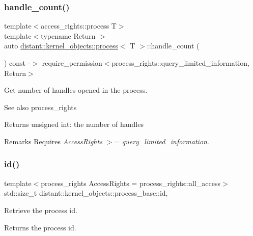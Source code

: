 \subsubsection{\texorpdfstring{handle\+\_\+count()}{handle\_count()}}
{\footnotesize\ttfamily template$<$access\+\_\+rights\+::process T$>$ \\
template$<$typename Return $>$ \\
auto \mbox{\hyperlink{classdistant_1_1kernel__objects_1_1process}{distant\+::kernel\+\_\+objects\+::process}}$<$ T $>$\+::handle\+\_\+count (\begin{DoxyParamCaption}{ }\end{DoxyParamCaption}) const -\/$>$ require\+\_\+permission$<$process\+\_\+rights\+::query\+\_\+limited\+\_\+information, Return$>$}



Get number of handles opened in the process. 

\begin{DoxySeeAlso}{See also}
process\+\_\+rights 
\end{DoxySeeAlso}
\begin{DoxyReturn}{Returns}
unsigned int\+: the number of handles 
\end{DoxyReturn}
\begin{DoxyRemark}{Remarks}
Requires {\itshape Access\+Rights} $>$= {\itshape query\+\_\+limited\+\_\+information}. 
\end{DoxyRemark}
\mbox{\label{classdistant_1_1kernel__objects_1_1process_a553b90767de864164d807075f67c1402}} 
\subsubsection{\texorpdfstring{id()}{id()}}
{\footnotesize\ttfamily template$<$process\+\_\+rights Access\+Rights = process\+\_\+rights\+::all\+\_\+access$>$ \\
std\+::size\+\_\+t distant\+::kernel\+\_\+objects\+::process\+\_\+base\+::id\hspace{0.3cm}{\ttfamily [inline]}, {\ttfamily [noexcept]}}



Retrieve the process id. 

\begin{DoxyReturn}{Returns}
the process id. 
\end{DoxyReturn}
\mbox{\label{classdistant_1_1kernel__objects_1_1process_ae78ed9e64b111eee962f2fdaf59630ed}} 

